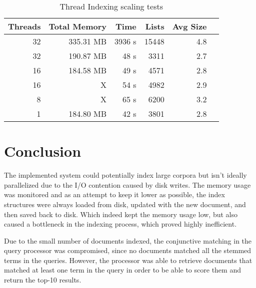 \begin{table}[htbp] \label{tab:threads} \centering
  \caption{Thread Indexing scaling tests}
  \begin{tabular}{rrrrrr}
    \toprule
    \textbf{Threads} & \textbf{Total Memory} & \textbf{Time} & \textbf{Lists} & \textbf{Avg Size} \\
    \midrule
    32               & 335.31 MB             & 3936 s        & 15448          & 4.8               \\ %
    32               & 190.87 MB             & 48 s          & 3311           & 2.7               \\
    16               & 184.58 MB             & 49 s          & 4571           & 2.8               \\
    16               & X                     & 54 s          & 4982           & 2.9               \\
    8                & X                     & 65 s          & 6200           & 3.2               \\
    1                & 184.80 MB             & 42 s          & 3801           & 2.8               \\
    \bottomrule
  \end{tabular}
\end{table}

\section{Conclusion}

The implemented system could potentially index large corpora but isn't ideally parallelized due to the I/O contention caused by disk writes. The memory usage was monitored and as an attempt to keep it lower as possible, the index structures were always loaded from disk, updated with the new document, and then saved back to disk. Which indeed kept the memory usage low, but also caused a bottleneck in the indexing process, which proved highly inefficient.

Due to the small number of documents indexed, the conjunctive matching in the query processor was compromised, since no documents matched all the stemmed terms in the queries. However, the processor was able to retrieve documents that matched at least one term in the query in order to be able to score them and return the top-10 results.


